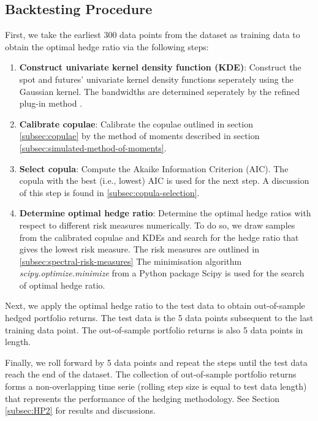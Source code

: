 \subsection{Backtesting Procedure}\label{sec:empirical-procedure}
First, we take the earliest 300 data points from the dataset 
as training data to obtain the optimal hedge ratio via the following steps:

\begin{enumerate}
\item \textbf{Construct univariate kernel density function (KDE)}:
  Construct the spot and futures' univariate kernel density functions seperately
  using the Gaussian kernel. The bandwidths are determined seperately by the refined plug-in method \citep[section
  3.3.3]{hardle2004nonparametric}.
\item \textbf{Calibrate copulae}:
  Calibrate the copulae outlined in section \ref{subsec:copulae} by the
  method of moments described in section \ref{subsec:simulated-method-of-moments}.
\item \textbf{Select copula}:
  Compute the Akaike Information Criterion (AIC). The copula with the
  best (i.e., lowest) AIC is used for the next step. 
  A discussion of this step is found in \ref{subsec:copula-selection}.
\item \textbf{Determine optimal hedge ratio}:
  Determine the optimal hedge ratios with respect to different
  risk measures numerically. 
  To do so, we draw samples from the calibrated copulae and KDEs 
  and search for the hedge ratio that gives the lowest risk measure. 
  The risk measures are outlined in \ref{subsec:spectral-risk-measures} 
  The minimisation algorithm \textit{scipy.optimize.minimize} from a Python package Scipy \citep{2020SciPy-NMeth} is used for the search of optimal hedge ratio.
\end{enumerate}

Next, we apply the optimal hedge ratio to the test data to obtain out-of-sample hedged portfolio returns.
The test data is the 5 data points subsequent to the last training data point. 
The out-of-sample portfolio returns is also 5 data points in length.

Finally, we roll forward by 5 data points and repeat the steps until the test data reach the end of the dataset. 
The collection of out-of-sample portfolio returns forms a non-overlapping time serie (rolling step size is equal to test data length) that represents the performance of 
the hedging methodology. See Section \ref{subsec:HP2} for results and discussions.  

